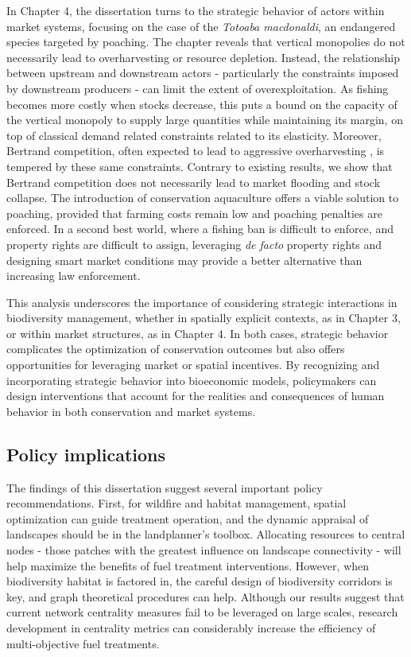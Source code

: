 In Chapter 4, the dissertation turns to the strategic behavior of actors within market systems, focusing on the case of the \textit{Totoaba macdonaldi}, an endangered species targeted by poaching. The chapter reveals that vertical monopolies do not necessarily lead to overharvesting or resource depletion. Instead, the relationship between upstream and downstream actors - particularly the constraints imposed by downstream producers - can limit the extent of overexploitation. As fishing becomes more costly when stocks decrease, this puts a bound on the capacity of the vertical monopoly to supply large quantities while maintaining its margin, on top of classical demand related constraints related to its elasticity. Moreover, Bertrand competition, often expected to lead to aggressive overharvesting \citep{bulte_economic_2005, damania_economics_2007}, is tempered by these same constraints. Contrary to existing results, we show that Bertrand competition does not necessarily lead to market flooding and stock collapse.  The introduction of conservation aquaculture offers a viable solution to poaching, provided that farming costs remain low and poaching penalties are enforced. In a second best world, where a fishing ban is difficult to enforce, and property rights are difficult to assign, leveraging \textit{de facto} property rights and designing smart market conditions may provide a better alternative than increasing law enforcement. 

This analysis underscores the importance of considering strategic interactions in biodiversity management, whether in spatially explicit contexts, as in Chapter 3, or within market structures, as in Chapter 4. In both cases, strategic behavior complicates the optimization of conservation outcomes but also offers opportunities for leveraging market or spatial incentives. By recognizing and incorporating strategic behavior into bioeconomic models, policymakers can design interventions that account for the realities and consequences of human behavior in both conservation and market systems.


{}
\subsection*{Policy implications}

The findings of this dissertation suggest several important policy recommendations. First, for wildfire and habitat management, spatial optimization can guide treatment operation, and the dynamic appraisal of landscapes should be in the landplanner's toolbox.
Allocating resources to central nodes - those patches with the greatest influence on landscape connectivity - will help maximize the benefits of fuel treatment interventions. However, when biodiversity habitat is factored in, the careful design of biodiversity corridors is key, and graph theoretical procedures can help. 
Although our results suggest that current network centrality measures fail to be leveraged on large scales, research development in centrality metrics can considerably increase the efficiency of multi-objective fuel treatments.

